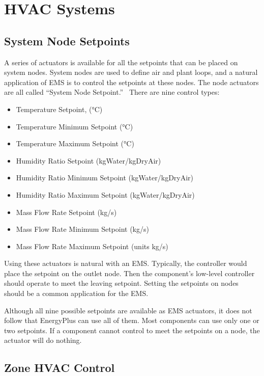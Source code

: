 \section{HVAC Systems}\label{hvac-systems}

\subsection{System Node Setpoints}\label{system-node-setpoints}

A series of actuators is available for all the setpoints that can be placed on system nodes. System nodes are used to define air and plant loops, and a natural application of EMS is to control the setpoints at these nodes. The node actuators are all called ``System Node Setpoint.''~ There are nine control types:

\begin{itemize}
\item
  Temperature Setpoint, (°C)
\item
  Temperature Minimum Setpoint (°C)
\item
  Temperature Maximum Setpoint (°C)
\item
  Humidity Ratio Setpoint (kgWater/kgDryAir)
\item
  Humidity Ratio Minimum Setpoint (kgWater/kgDryAir)
\item
  Humidity Ratio Maximum Setpoint (kgWater/kgDryAir)
\item
  Mass Flow Rate Setpoint (kg/s)
\item
  Mass Flow Rate Minimum Setpoint (kg/s)
\item
  Mass Flow Rate Maximum Setpoint (units kg/s)
\end{itemize}

Using these actuators is natural with an EMS. Typically, the controller would place the setpoint on the outlet node. Then the component's low-level controller should operate to meet the leaving setpoint. Setting the setpoints on nodes should be a common application for the EMS.

Although all nine possible setpoints are available as EMS actuators, it does not follow that EnergyPlus can use all of them. Most components can use only one or two setpoints. If a component cannot control to meet the setpoints on a node, the actuator will do nothing.

\subsection{Zone HVAC Control}\label{zone-hvac-control}

